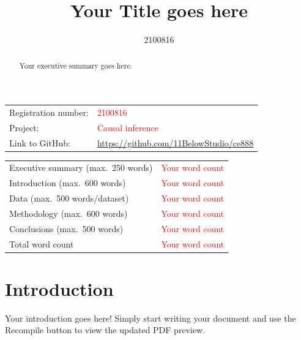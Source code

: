 \documentclass{article}
\title{Your Title goes here}
\author{2100816}
\begin{document}
\maketitle

\begin{table}[h]
    \centering
    \begin{tabular}{ll}
        Registration number: & \textcolor{red}{2100816}\\
        Project: & \textcolor{red}{Causal inference}\\
        Link to GitHub: & \url{https://github.com/11BelowStudio/ce888}\\
    \end{tabular}
\end{table}



\begin{table}[h]
    \centering
    \begin{tabular}{lc}
        Executive summary (max.\ 250 words) & \textcolor{red}{Your word count}\\
        Introduction (max.\ 600 words) & \textcolor{red}{Your word count}\\
        Data (max.\ 500 words/dataset) & \textcolor{red}{Your word count}\\
        Methodology (max.\ 600 words) & \textcolor{red}{Your word count}\\
        Conclusions (max.\ 500 words) & \textcolor{red}{Your word count}\\
        \hline
        Total word count & \textcolor{red}{Your word count}\\
    \end{tabular}
\end{table}

\tableofcontents

\clearpage



\begin{abstract}
Your executive summary goes here.
\end{abstract}


\section{Introduction}

Your introduction goes here! Simply start writing your document and use the
Recompile button to view the updated PDF preview.
\end{document}
